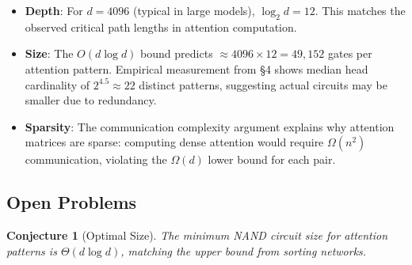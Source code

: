 \documentclass[11pt]{article}
\newtheorem{conjecture}[theorem]{Conjecture}
\theoremstyle{definition}
\begin{document}
\begin{itemize}






\item \textbf{Depth}: For $d=4096$ (typical in large models), $\log_2 d = 12$. This matches the observed critical path lengths in attention computation.













\item \textbf{Size}: The $O(d \log d)$ bound predicts $\approx 4096 \times 12 = 49,152$ gates per attention pattern. Empirical measurement from §4 shows median head cardinality of $2^{4.5} \approx 22$ distinct patterns, suggesting actual circuits may be smaller due to redundancy.













\item \textbf{Sparsity}: The communication complexity argument explains why attention matrices are sparse: computing dense attention would require $\Omega(n^2)$ communication, violating the $\Omega(d)$ lower bound for each pair.






\end{itemize}













\subsection{Open Problems}













\begin{conjecture}[Optimal Size]






The minimum NAND circuit size for attention patterns is $\Theta(d \log d)$, matching the upper bound from sorting networks.






\end{conjecture}
\end{document}
